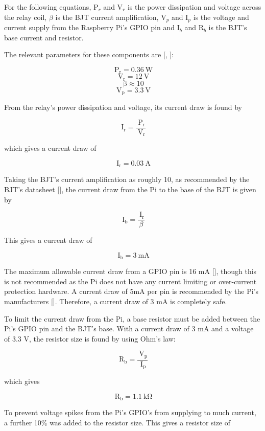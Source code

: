 For the following equations, P$_r$ and V$_r$ is the power dissipation and
voltage across the relay coil, $\beta$ is the BJT current amplification, V$_p$
and I$_p$ is the voltage and current supply from the Raspberry Pi's GPIO pin and
I$_b$ and R$_b$ is the BJT's base current and resistor.

The relevant  parameters for these components are [\cite{manual:relay-specs},
\cite{maunual:transistor-datasheet}]:

\[ \mathrm{\ P_{r}} = 0.36\mathrm{\ W}\]
\[ \mathrm{\ V_{r}} = 12\mathrm{\ V}\]
\[ \mathrm{\ \beta} \approx 10\]
\[ \mathrm{\ V_{p}} = 3.3\mathrm{\ V}\]

From the relay's power dissipation and voltage, its current draw is found by

\[
\mathrm{\ I_{r}} = \frac{\mathrm{\ P_{r}}}{\mathrm{\ V_{r}}}
\]

which gives a current draw of

\[
\mathrm{\ I_{r}} = 0.03\mathrm{\ A}
\]

Taking the BJT's current amplification as roughly 10, as recommended by the
BJT's datasheet [\cite{maunual:transistor-datasheet}], the current draw from the
Pi to the base of the BJT is given by

\[
\mathrm{\ I_{b}} = \frac{\mathrm{\ I_{r}}}{\beta}
\]

This gives a current draw of

\[
\mathrm{\ I_{b}} = 3\mathrm{\ mA}
\]

The maximum allowable current draw from a GPIO pin is 16 mA
[\cite{website:gpio-specs}], though this is not recommended as the Pi does not
have any current limiting or over-current protection hardware. A current draw of 5mA per
pin is recommended by the Pi's manufacturers [\cite{website:gpio-specs}]. Therefore, a
current draw of 3 mA is completely safe.

To limit the current draw from the Pi, a base resistor must be added between the Pi's GPIO pin
and the BJT's base. With a current draw of 3 mA and a voltage of 3.3 V, the
resistor size is found by using Ohm's law:

\[
\mathrm{\ R_{b}} = \frac{\mathrm{\ V_{p}}}{\mathrm{\ I_{p}}}
\]

which gives

\[
\mathrm{\ R_{b}} = 1.1\mathrm{\ k\Omega}
\]

To prevent voltage spikes from the Pi's GPIO's from supplying to much current, a
further 10\% was added to the resistor size. This gives a resistor size of


